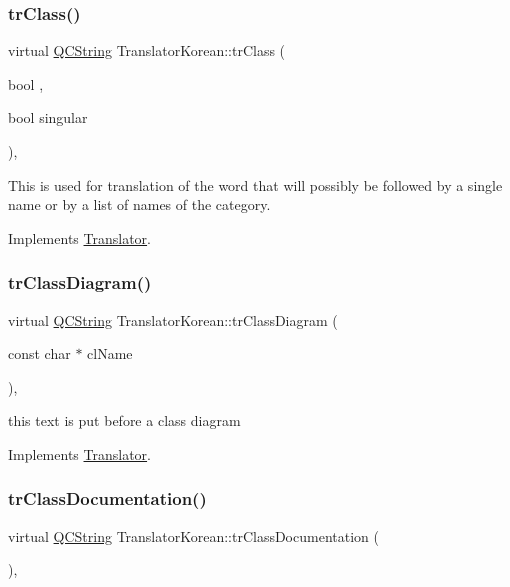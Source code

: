 \subsubsection{\texorpdfstring{trClass()}{trClass()}}
{\footnotesize\ttfamily virtual \mbox{\hyperlink{class_q_c_string}{Q\+C\+String}} Translator\+Korean\+::tr\+Class (\begin{DoxyParamCaption}\item[{bool}]{,  }\item[{bool}]{singular }\end{DoxyParamCaption})\hspace{0.3cm}{\ttfamily [inline]}, {\ttfamily [virtual]}}

This is used for translation of the word that will possibly be followed by a single name or by a list of names of the category. 

Implements \mbox{\hyperlink{class_translator}{Translator}}.

\mbox{\label{class_translator_korean_ade800d29523adad5dc3c6824e8ad91cf}} 
\subsubsection{\texorpdfstring{trClassDiagram()}{trClassDiagram()}}
{\footnotesize\ttfamily virtual \mbox{\hyperlink{class_q_c_string}{Q\+C\+String}} Translator\+Korean\+::tr\+Class\+Diagram (\begin{DoxyParamCaption}\item[{const char $\ast$}]{cl\+Name }\end{DoxyParamCaption})\hspace{0.3cm}{\ttfamily [inline]}, {\ttfamily [virtual]}}

this text is put before a class diagram 

Implements \mbox{\hyperlink{class_translator}{Translator}}.

\mbox{\label{class_translator_korean_abd327cbf4d2620a8d3a3d9e4d9ed5b55}} 
\subsubsection{\texorpdfstring{trClassDocumentation()}{trClassDocumentation()}}
{\footnotesize\ttfamily virtual \mbox{\hyperlink{class_q_c_string}{Q\+C\+String}} Translator\+Korean\+::tr\+Class\+Documentation (\begin{DoxyParamCaption}{ }\end{DoxyParamCaption})\hspace{0.3cm}{\ttfamily [inline]}, {\ttfamily [virtual]}}

